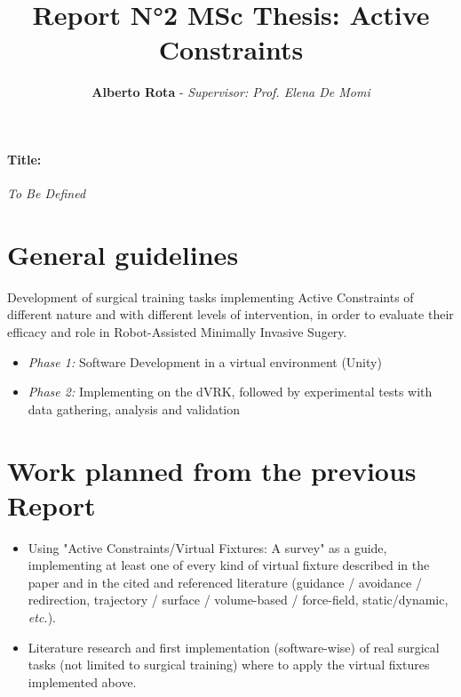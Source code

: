 \documentclass{article}
\title{\textbf{Report N°2 MSc Thesis: Active Constraints}}
\author{\textbf{Alberto Rota} - \textit{Supervisor: Prof. Elena De Momi}}
\date{}
\begin{document}
\maketitle
\paragraph{Title:} \textit{To Be Defined}
\section*{General guidelines}
    Development of surgical training tasks implementing Active Constraints of
    different nature and with different levels of intervention, in order to
    evaluate their efficacy and role in Robot-Assisted Minimally Invasive
    Sugery.
    \begin{itemize}
        \item \textit{Phase 1: }Software Development in a virtual environment
        (Unity)
        \item \textit{Phase 2: }Implementing on the dVRK, followed by
        experimental tests with data gathering, analysis and validation
    \end{itemize}

\section*{Work planned from the previous Report}

\begin{itemize}
    \item
    Using "Active Constraints/Virtual Fixtures: A survey" as a guide,    
    implementing at least one of every kind of virtual fixture described in the
    paper and in the cited and referenced literature (guidance / avoidance /
    redirection, trajectory / surface / volume-based / force-field,
    static/dynamic, \textit{etc.}).
    \item 
    Literature research and first implementation (software-wise) of real
    surgical tasks (not limited to surgical training) where to apply the virtual
    fixtures implemented above. 
\end{itemize}
\end{document}
